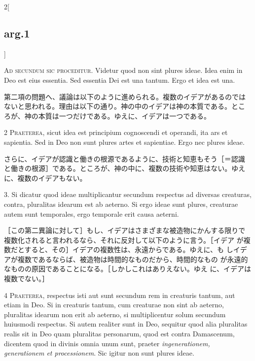 \documentclass[paper=a4paper,fontsize=10pt,jafontsize=9pt,titlepage]{jlreq}
\begin{document}
\begin{paracol}{2}[\subsection{arg.1}]

{\huge A}{\scshape d secundum sic proceditur}. Videtur quod
non sint plures ideae. Idea enim in Deo est eius essentia. Sed essentia
Dei est una tantum. Ergo et idea est una.

\switchcolumn

第二項の問題へ、議論は以下のように進められる。複数のイデアがあるのでは
ないと思われる。理由は以下の通り。神の中のイデアは神の本質である。とこ
ろが、神の本質は一つだけである。ゆえに、イデアは一つである。


{\scshape 2 Praeterea}, sicut idea est principium cognoscendi et
operandi, ita ars et sapientia. Sed in Deo non sunt plures artes et
sapientiae. Ergo nec plures ideae.

\switchcolumn

さらに、イデアが認識と働きの根源であるように、技術と知恵もそう［＝認識
と働きの根源］である。ところが、神の中に、複数の技術や知恵はない。ゆえ
に、複数のイデアもない。

\switchcolumn*

3. Si dicatur quod ideae multiplicantur secundum respectus ad diversas
creaturas, contra, pluralitas idearum est ab aeterno. Si ergo ideae
sunt plures, creaturae autem sunt temporales, ergo temporale erit
causa aeterni.

\switchcolumn

［この第二異論に対して］もし、イデアはさまざまな被造物にかんする限りで
 複数化されると言われるなら、それに反対して以下のように言う。［イデア
 が複数だとすると、その］イデアの複数性は、永遠からである。ゆえに、も
 しイデアが複数であるならば、被造物は時間的なものだから、時間的なもの
 が永遠的なものの原因であることになる。［しかしこれはありえない。ゆえ
 に、イデアは複数でない。］


{\scshape 4 Praeterea}, respectus isti aut sunt secundum rem in
creaturis tantum, aut etiam in Deo. Si in creaturis tantum, cum
creaturae non sint ab aeterno, pluralitas idearum non erit ab aeterno,
si multiplicentur solum secundum huiusmodi respectus. Si autem
realiter sunt in Deo, sequitur quod alia pluralitas realis sit in Deo
quam pluralitas personarum, quod est contra Damascenum, dicentem quod
in divinis omnia unum sunt, praeter {\itshape ingenerationem,
generationem et processionem}. Sic igitur non sunt plures ideae.


\end{paracol}
\end{document}
